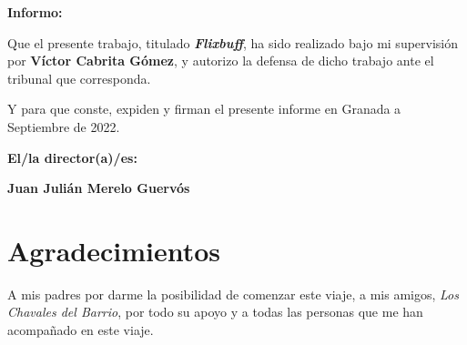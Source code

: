\vspace{0.5cm}

\textbf{Informo:}

\vspace{0.5cm}

Que el presente trabajo, titulado \textit{\textbf{Flixbuff}},
ha sido realizado bajo mi supervisión por \textbf{Víctor Cabrita Gómez}, y autorizo la defensa de dicho trabajo ante el tribunal
que corresponda.

\vspace{0.5cm}

Y para que conste, expiden y firman el presente informe en Granada a Septiembre de 2022.

\vspace{1cm}

\textbf{El/la director(a)/es: }

\vspace{5cm}

\noindent \textbf{Juan Julián Merelo Guervós}

\chapter*{Agradecimientos}

A mis padres por darme la posibilidad de comenzar este viaje, a mis amigos, \textit{Los Chavales del Barrio}, por todo su apoyo y a todas las personas que me han acompañado en este viaje.